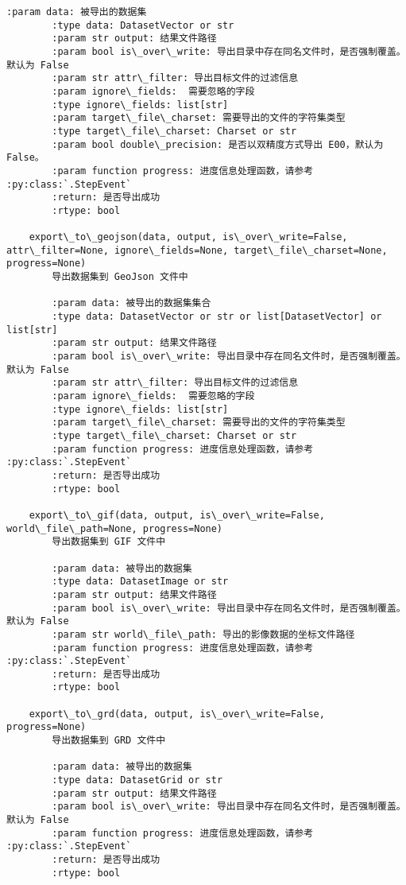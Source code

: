 \documentclass[11pt]{article}
\begin{document}
\begin{Verbatim}[commandchars=\\\{\}]
        :param data: 被导出的数据集
        :type data: DatasetVector or str
        :param str output: 结果文件路径
        :param bool is\_over\_write: 导出目录中存在同名文件时，是否强制覆盖。默认为 False
        :param str attr\_filter: 导出目标文件的过滤信息
        :param ignore\_fields:  需要忽略的字段
        :type ignore\_fields: list[str]
        :param target\_file\_charset: 需要导出的文件的字符集类型
        :type target\_file\_charset: Charset or str
        :param bool double\_precision: 是否以双精度方式导出 E00，默认为 False。
        :param function progress: 进度信息处理函数，请参考 :py:class:`.StepEvent`
        :return: 是否导出成功
        :rtype: bool
    
    export\_to\_geojson(data, output, is\_over\_write=False, attr\_filter=None, ignore\_fields=None, target\_file\_charset=None, progress=None)
        导出数据集到 GeoJson 文件中
        
        :param data: 被导出的数据集集合
        :type data: DatasetVector or str or list[DatasetVector] or list[str]
        :param str output: 结果文件路径
        :param bool is\_over\_write: 导出目录中存在同名文件时，是否强制覆盖。默认为 False
        :param str attr\_filter: 导出目标文件的过滤信息
        :param ignore\_fields:  需要忽略的字段
        :type ignore\_fields: list[str]
        :param target\_file\_charset: 需要导出的文件的字符集类型
        :type target\_file\_charset: Charset or str
        :param function progress: 进度信息处理函数，请参考 :py:class:`.StepEvent`
        :return: 是否导出成功
        :rtype: bool
    
    export\_to\_gif(data, output, is\_over\_write=False, world\_file\_path=None, progress=None)
        导出数据集到 GIF 文件中
        
        :param data: 被导出的数据集
        :type data: DatasetImage or str
        :param str output: 结果文件路径
        :param bool is\_over\_write: 导出目录中存在同名文件时，是否强制覆盖。默认为 False
        :param str world\_file\_path: 导出的影像数据的坐标文件路径
        :param function progress: 进度信息处理函数，请参考 :py:class:`.StepEvent`
        :return: 是否导出成功
        :rtype: bool
    
    export\_to\_grd(data, output, is\_over\_write=False, progress=None)
        导出数据集到 GRD 文件中
        
        :param data: 被导出的数据集
        :type data: DatasetGrid or str
        :param str output: 结果文件路径
        :param bool is\_over\_write: 导出目录中存在同名文件时，是否强制覆盖。默认为 False
        :param function progress: 进度信息处理函数，请参考 :py:class:`.StepEvent`
        :return: 是否导出成功
        :rtype: bool
    

\end{Verbatim}
\end{document}
